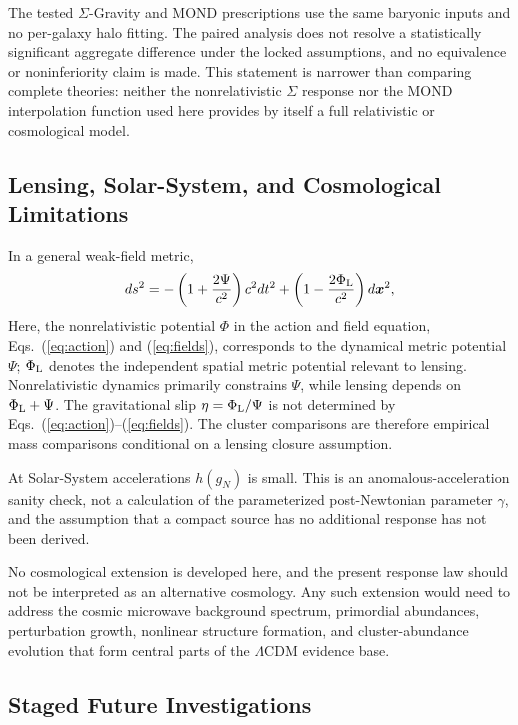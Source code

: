 \documentclass[aps,prd,reprint,superscriptaddress,showpacs,floatfix,longbibliography]{revtex4-2}
\begin{document}
The tested $\Sigma$-Gravity and MOND prescriptions use the same baryonic inputs and no per-galaxy halo fitting. The paired analysis does not resolve a statistically significant aggregate difference under the locked assumptions, and no equivalence or noninferiority claim is made. This statement is narrower than comparing complete theories: neither the nonrelativistic $\Sigma$ response nor the MOND interpolation function used here provides by itself a full relativistic or cosmological model.

\subsection{Lensing, Solar-System, and Cosmological Limitations}

In a general weak-field metric,
\begin{equation}
ds^2=-\left(1+\frac{2\Psi}{c^2}\right)c^2dt^2
+\left(1-\frac{2\Phi_{\rm L}}{c^2}\right)d\bm{x}^2,
\label{eq:metric}
\end{equation}
Here, the nonrelativistic potential $\Phi$ in the action and field equation, Eqs.~(\ref{eq:action}) and (\ref{eq:fields}), corresponds to the dynamical metric potential $\Psi$; $\Phi_{\rm L}$ denotes the independent spatial metric potential relevant to lensing. Nonrelativistic dynamics primarily constrains $\Psi$, while lensing depends on $\Phi_{\rm L}+\Psi$. The gravitational slip $\eta=\Phi_{\rm L}/\Psi$ is not determined by Eqs.~(\ref{eq:action})--(\ref{eq:fields}). The cluster comparisons are therefore empirical mass comparisons conditional on a lensing closure assumption.

At Solar-System accelerations $h(g_N)$ is small. This is an anomalous-acceleration sanity check, not a calculation of the parameterized post-Newtonian parameter $\gamma$, and the assumption that a compact source has no additional response has not been derived.

No cosmological extension is developed here, and the present response law should not be interpreted as an alternative cosmology. Any such extension would need to address the cosmic microwave background spectrum, primordial abundances, perturbation growth, nonlinear structure formation, and cluster-abundance evolution that form central parts of the $\Lambda$CDM evidence base.

\subsection{Staged Future Investigations}
\end{document}
